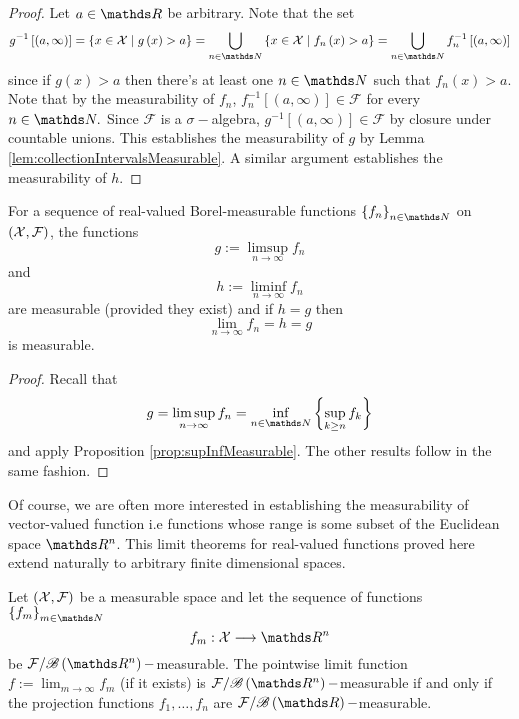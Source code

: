 \begin{proof}
Let $a\in\R$ be arbitrary. Note that the set
\[
g^{-1}\left[\left(a,\infty\right)\right]=\left\{ x\in\X\mid g\left(x\right)>a\right\} =\bigcup_{n\in\N}\left\{ x\in\X\mid f_{n}\left(x\right)>a\right\} =\bigcup_{n\in\N}f_{n}^{-1}\left[\left(a,\infty\right)\right]
\]
since if $g\left(x\right)>a$ then there's at least one $n\in\N$
such that $f_{n}\left(x\right)>a$. Note that by the measurability
of $f_{n}$, $f_{n}^{-1}\left[\left(a,\infty\right)\right]\in\mathcal{F}$
for every $n\in\N.$ Since $\mathcal{F}$ is a $\sigma-$algebra,
$g^{-1}\left[\left(a,\infty\right)\right]\in\mathcal{F}$ by closure
under countable unions. This establishes the measurability of $g$
by Lemma \ref{lem:collectionIntervalsMeasurable}. A similar argument
establishes the measurability of $h$.
\end{proof}
\begin{cor}
\label{cor:limSupLimInfMeasurable}For a sequence of real-valued Borel-measurable
functions $\left\{ f_{n}\right\} _{n\in\N}$ on $\left(\mathcal{X},\mathcal{F}\right)$,
the functions
\[
g:=\limsup_{n\to\infty}f_{n}
\]
and 
\[
h:=\liminf_{n\to\infty}f_{n}
\]
are measurable (provided they exist) and if $h=g$ then 
\[
\lim_{n\to\infty}f_{n}=h=g
\]
is measurable.
\end{cor}

\begin{proof}
Recall that 
\[
g=\limsup_{n\to\infty}f_{n}=\inf_{n\in\N}\left\{ \sup_{k\geq n}f_{k}\right\} 
\]
and apply Proposition \ref{prop:supInfMeasurable}. The other results
follow in the same fashion.
\end{proof}
Of course, we are often more interested in establishing the measurability
of vector-valued function i.e functions whose range is some subset
of the Euclidean space $\R^{n}$. This limit theorems for real-valued
functions proved here extend naturally to arbitrary finite dimensional
spaces.
\begin{prop}
Let $\left(\mathcal{X},\mathcal{F}\right)$ be a measurable space and let the
sequence of functions $\left\{ f_{m}\right\} _{m\in\N}$
\[
f_{m}:\X\longrightarrow\R^{n}
\]
be $\mathcal{F}/\borel\left(\R^{n}\right)-$measurable. The pointwise
limit function $f:=\lim_{m\to\infty}f_{m}$ (if it exists) is $\mathcal{F}/\borel\left(\R^{n}\right)-$measurable
if and only if the projection functions $f_{1},\ldots,f_{n}$ are
$\mathcal{F}/\borel\left(\R\right)-$measurable.
\end{prop}

